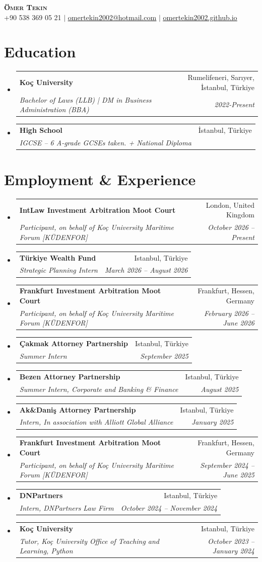 \documentclass[letterpaper,11pt]{article}
\makeatletter
\newcommand{\resumeSubheading}[4]{\vspace{-2pt}\item
    \begin{tabular*}{0.97\textwidth}[t]{l@{\extracolsep{\fill}}r}
      \textbf{#1} & #2 \\[-3pt]
      \textit{\small#3} & \textit{\small #4} \\
    \end{tabular*} \vspace{-2.5pt}
}
\newcommand{\resumeSubHeadingListStart}{\begin{itemize}[leftmargin=0.15in, label={}, itemsep=0pt, parsep=0pt]}
\newcommand{\resumeSubHeadingListEnd}{\end{itemize}\vspace{-25pt}}
\makeatother
\begin{document}
\begin{center}
    \textbf{\Huge \scshape Ömer Tekin} \\ \vspace{1pt}
    \small +90 538 369 05 21 $|$ \href{mailto:omertekin2002@hotmail.com}{\underline{omertekin2002@hotmail.com}} $|$ 
    \href{https://omertekin2002.github.io}{\underline{omertekin2002.github.io}}
\end{center}


\section{Education}
  \resumeSubHeadingListStart
    \resumeSubheading
      {Koç University}{Rumelifeneri, Sarıyer, İstanbul, Türkiye}
      {Bachelor of Laws (LLB) | DM in Business Administration (BBA)}{2022-Present}
    \resumeSubheading
      {High School}{İstanbul, Türkiye}
      {IGCSE – 6 A-grade GCSEs taken. + National Diploma}{}
  \resumeSubHeadingListEnd


\section{Employment \& Experience}
  \resumeSubHeadingListStart
    \resumeSubheading
      {IntLaw Investment Arbitration Moot Court}{London, United Kingdom}
      {Participant, on behalf of Koç University Maritime Forum [KÜDENFOR]}{October 2026 – Present}
    \resumeSubheading
      {Türkiye Wealth Fund}{Istanbul, Türkiye}
      {Strategic Planning Intern}{March 2026 – August 2026}
    \resumeSubheading
      {Frankfurt Investment Arbitration Moot Court}{Frankfurt, Hessen, Germany}
      {Participant, on behalf of Koç University Maritime Forum [KÜDENFOR]}{February 2026 – June 2026}
    \resumeSubheading
      {Çakmak Attorney Partnership}{Istanbul, Türkiye}
      {Summer Intern}{September 2025}
    \resumeSubheading
      {Bezen Attorney Partnership}{Istanbul, Türkiye}
      {Summer Intern, Corporate and Banking \& Finance}{August 2025}
    \resumeSubheading
      {Ak\&Daniş Attorney Partnership}{Istanbul, Türkiye}
      {Intern, In association with Alliott Global Alliance}{January 2025}
    \resumeSubheading
      {Frankfurt Investment Arbitration Moot Court}{Frankfurt, Hessen, Germany}
      {Participant, on behalf of Koç University Maritime Forum [KÜDENFOR]}{September 2024 – June 2025}
    \resumeSubheading
      {DNPartners}{Istanbul, Türkiye}
      {Intern, DNPartners Law Firm}{October 2024 – November 2024}
    \resumeSubheading
      {Koç University}{Istanbul, Türkiye}
      {Tutor, Koç University Office of Teaching and Learning, Python}{October 2023 – January 2024}
  \resumeSubHeadingListEnd
\end{document}
